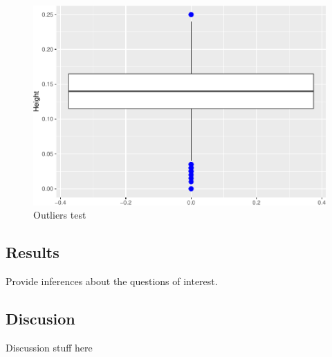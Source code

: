 \documentclass[9pt,twocolumn,twoside,]{pnas-new}
\begin{document}
\begin{figure}
\includegraphics[width=0.98\columnwidth]{project_rticles_files/figure-latex/plot2-1} \caption{Outliers test}\label{fig:plot2}
\end{figure}

\subsection*{Results}\label{results}

Provide inferences about the questions of interest.

\subsection{Discusion}\label{discussion}

Discussion stuff here
\end{document}
